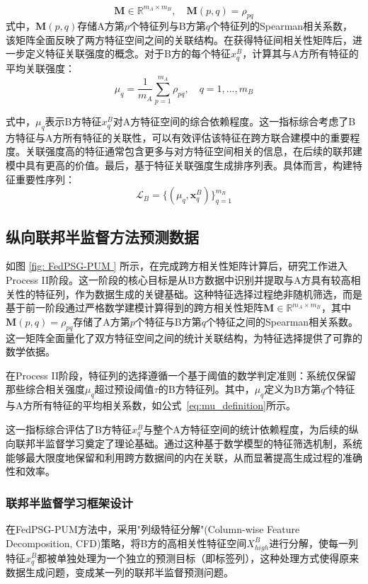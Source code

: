 \begin{equation}
	\mathbf{M} \in \mathbb{R}^{m_A \times m_B}, \quad \mathbf{M}(p,q) = \rho_{pq}
\end{equation}
式中，$\mathbf{M}(p,q)$存储A方第$p$个特征列与B方第$q$个特征列的Spearman相关系数，该矩阵全面反映了两方特征空间之间的关联结构。在获得特征间相关性矩阵后，进一步定义特征关联强度的概念。对于B方的每个特征$x^B_q$，计算其与A方所有特征的平均关联强度：
\begin{equation}
	\mu_q = \frac{1}{m_A} \sum_{p=1}^{m_A} \rho_{pq}, \quad q=1,...,m_B
	\label{eq:mu_definition}
\end{equation}

式中，$\mu_q$表示B方特征$x^B_q$对A方特征空间的综合依赖程度。这一指标综合考虑了B方特征与A方所有特征的关联性，可以有效评估该特征在跨方联合建模中的重要程度。关联强度高的特征通常包含更多与对方特征空间相关的信息，在后续的联邦建模中具有更高的价值。最后，基于特征关联强度生成排序列表。具体而言，构建特征重要性序列：
\begin{equation}
	\mathcal{L}_B = \{(\mu_q, \mathbf{x}^B_q)\}_{q=1}^{m_B}
\end{equation}
\subsection{纵向联邦半监督方法预测数据}
如图 \ref{fig: FedPSG-PUM } 所示，在完成跨方相关性矩阵计算后，研究工作进入Process II阶段。这一阶段的核心目标是从B方数据中识别并提取与A方具有较高相关性的特征列，作为数据生成的关键基础。这种特征选择过程绝非随机筛选，而是基于前一阶段通过严格数学建模计算得到的跨方相关性矩阵$\mathbf{M} \in \mathbb{R}^{m_A \times m_B}$，其中$\mathbf{M}(p,q) = \rho_{pq}$存储了A方第$p$个特征与B方第$q$个特征之间的Spearman相关系数。这一矩阵全面量化了双方特征空间之间的统计关联结构，为特征选择提供了可靠的数学依据。

在Process II阶段，特征列的选择遵循一个基于阈值的数学判定准则：系统仅保留那些综合相关强度$\mu_q$超过预设阈值$\tau$的B方特征列。其中，$\mu_q$定义为B方第$q$个特征与A方所有特征的平均相关系数，如公式~\eqref{eq:mu_definition}所示。

这一指标综合评估了B方特征$x^B_q$与整个A方特征空间的统计依赖程度，为后续的纵向联邦半监督学习奠定了理论基础。通过这种基于数学模型的特征筛选机制，系统能够最大限度地保留和利用跨方数据间的内在关联，从而显著提高生成过程的准确性和效率。

\subsubsection{联邦半监督学习框架设计}
在FedPSG-PUM方法中，采用"列级特征分解"(Column-wise Feature Decomposition, CFD)策略，将B方的高相关性特征空间$X^B_{high}$进行分解，使每一列特征$x^B_q$都被单独处理为一个独立的预测目标（即标签列），这种处理方式使得原来数据生成问题，变成某一列的联邦半监督预测问题。

